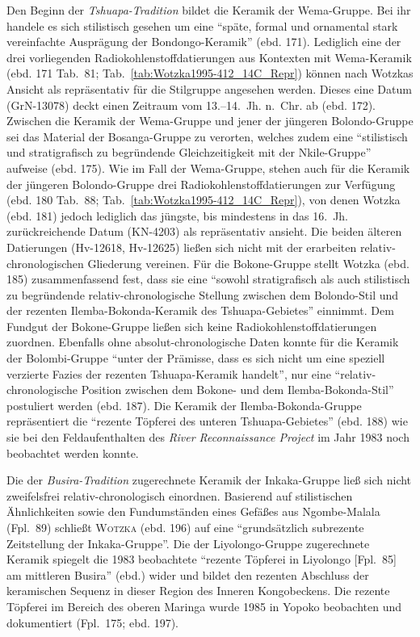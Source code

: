 Den Beginn der \textit{Tshuapa-Tradition} bildet die Keramik der Wema-Gruppe. Bei ihr handele es sich stilistisch gesehen um eine \enquote{späte, formal und ornamental stark vereinfachte Ausprägung der Bondongo-Keramik} (ebd. 171). Lediglich eine der drei vorliegenden Radiokohlenstoffdatierungen aus Kontexten mit Wema-Keramik (ebd. 171 Tab.~81; Tab.~\ref{tab:Wotzka1995-412_14C_Repr}) können nach Wotzkas Ansicht als repräsentativ für die Stilgruppe angesehen werden. Dieses eine Datum (GrN-13078) deckt einen Zeitraum vom \mbox{13.--14.~Jh.} n.~Chr. ab (ebd. 172). Zwischen die Keramik der Wema-Gruppe und jener der jüngeren Bolondo-Gruppe sei das Material der Bosanga-Gruppe zu verorten, welches zudem eine \enquote{stilistisch und stratigrafisch zu begründende Gleichzeitigkeit mit der Nkile-Gruppe} aufweise (ebd. 175). Wie im Fall der Wema-Gruppe, stehen auch für die Keramik der jüngeren Bolondo-Gruppe drei Radiokohlenstoffdatierungen zur Verfügung (ebd. 180 Tab.~88; Tab.~\ref{tab:Wotzka1995-412_14C_Repr}), von denen Wotzka (ebd. 181) jedoch lediglich das jüngste, bis mindestens in das 16.~Jh. zurückreichende Datum (KN-4203) als repräsentativ ansieht. Die beiden älteren Datierungen (Hv-12618, Hv-12625) ließen sich nicht mit der erarbeiten relativ-chronologischen Gliederung vereinen. Für die Bokone-Gruppe stellt Wotzka (ebd. 185) zusammenfassend fest, dass sie eine \enquote{sowohl stratigrafisch als auch stilistisch zu begründende relativ-chronologische Stellung zwischen dem Bolondo-Stil und der rezenten Ilemba-Bokonda-Keramik des Tshuapa-Gebietes} einnimmt. Dem Fundgut der Bokone-Gruppe ließen sich keine Radiokohlenstoffdatierungen zuordnen. Ebenfalls ohne absolut-chronologische Daten konnte für die Keramik der Bolombi-Gruppe \enquote{unter der Prämisse, dass es sich nicht um eine speziell verzierte Fazies der rezenten Tshuapa-Keramik handelt}, nur eine \enquote{relativ-chronologische Position zwischen dem Bokone- und dem Ilemba-Bokonda-Stil} postuliert werden (ebd. 187). Die Keramik der Ilemba-Bokonda-Gruppe repräsentiert die \enquote{rezente Töpferei des unteren Tshuapa-Gebietes} (ebd. 188) wie sie bei den Feldaufenthalten des \textit{River Reconnaissance Project} im Jahr 1983 noch beobachtet werden konnte.

Die der \textit{Busira-Tradition} zugerechnete Keramik der Inkaka-Gruppe ließ sich nicht zweifelsfrei relativ-chronologisch einordnen. Basierend auf stilistischen Ähnlichkeiten sowie den Fundumständen eines Gefäßes aus Ngombe-Malala (Fpl.~89) schließt \textsc{Wotzka} (ebd. 196) auf eine \enquote{grundsätzlich subrezente Zeitstellung der Inkaka-Gruppe}. Die der Liyolongo-Gruppe zugerechnete Keramik spiegelt die 1983 beobachtete \enquote{rezente Töpferei in Liyolongo [Fpl.~85] am mittleren Busira} (ebd.) wider und bildet den rezenten Abschluss der keramischen Sequenz in dieser Region des Inneren Kongobeckens. Die rezente Töpferei im Bereich des oberen Maringa wurde 1985 in Yopoko beobachten und dokumentiert (Fpl.~175; ebd. 197). 

